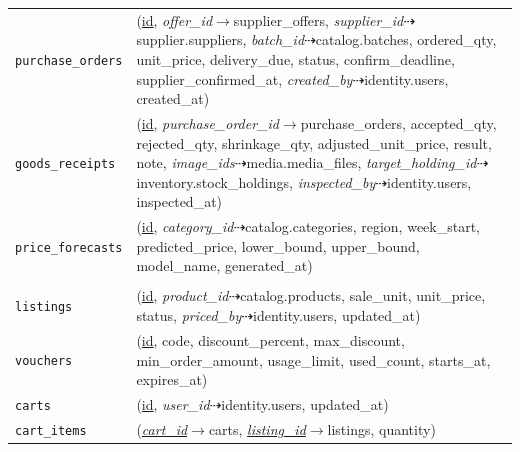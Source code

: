 \begin{longtable}{L{3.10cm} L{11.90cm}}
\texttt{purchase\_\allowbreak{}orders} & (\underline{id}, \textit{offer\_\allowbreak{}id}$\rightarrow$supplier\_\allowbreak{}offers, \textit{supplier\_\allowbreak{}id}$\dashrightarrow$supplier.suppliers, \textit{batch\_\allowbreak{}id}$\dashrightarrow$catalog.batches, ordered\_\allowbreak{}qty, unit\_\allowbreak{}price, delivery\_\allowbreak{}due, status, confirm\_\allowbreak{}deadline, supplier\_\allowbreak{}confirmed\_\allowbreak{}at, \textit{created\_\allowbreak{}by}$\dashrightarrow$identity.users, created\_\allowbreak{}at) \\
\texttt{goods\_\allowbreak{}receipts} & (\underline{id}, \textit{purchase\_\allowbreak{}order\_\allowbreak{}id}$\rightarrow$purchase\_\allowbreak{}orders, accepted\_\allowbreak{}qty, rejected\_\allowbreak{}qty, shrinkage\_\allowbreak{}qty, adjusted\_\allowbreak{}unit\_\allowbreak{}price, result, note, \textit{image\_\allowbreak{}ids}$\dashrightarrow$media.media\_\allowbreak{}files, \textit{target\_\allowbreak{}holding\_\allowbreak{}id}$\dashrightarrow$inventory.stock\_\allowbreak{}holdings, \textit{inspected\_\allowbreak{}by}$\dashrightarrow$identity.users, inspected\_\allowbreak{}at) \\
\texttt{price\_\allowbreak{}forecasts} & (\underline{id}, \textit{category\_\allowbreak{}id}$\dashrightarrow$catalog.categories, region, week\_\allowbreak{}start, predicted\_\allowbreak{}price, lower\_\allowbreak{}bound, upper\_\allowbreak{}bound, model\_\allowbreak{}name, generated\_\allowbreak{}at) \\
 \\
\texttt{listings} & (\underline{id}, \textit{product\_\allowbreak{}id}$\dashrightarrow$catalog.products, sale\_\allowbreak{}unit, unit\_\allowbreak{}price, status, \textit{priced\_\allowbreak{}by}$\dashrightarrow$identity.users, updated\_\allowbreak{}at) \\
\texttt{vouchers} & (\underline{id}, code, discount\_\allowbreak{}percent, max\_\allowbreak{}discount, min\_\allowbreak{}order\_\allowbreak{}amount, usage\_\allowbreak{}limit, used\_\allowbreak{}count, starts\_\allowbreak{}at, expires\_\allowbreak{}at) \\
\texttt{carts} & (\underline{id}, \textit{user\_\allowbreak{}id}$\dashrightarrow$identity.users, updated\_\allowbreak{}at) \\
\texttt{cart\_\allowbreak{}items} & (\textit{\underline{cart\_\allowbreak{}id}}$\rightarrow$carts, \textit{\underline{listing\_\allowbreak{}id}}$\rightarrow$listings, quantity) \\

\end{longtable}
